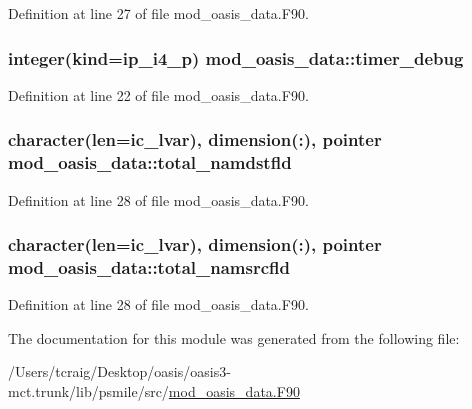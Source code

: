Definition at line 27 of file mod\+\_\+oasis\+\_\+data.\+F90.

\hypertarget{classmod__oasis__data_a320a34357de5c3049ccf102df7b97f5e}{
\subsubsection[{timer\+\_\+debug}]{\setlength{\rightskip}{0pt plus 5cm}integer(kind=ip\+\_\+i4\+\_\+p) mod\+\_\+oasis\+\_\+data\+::timer\+\_\+debug}}\label{classmod__oasis__data_a320a34357de5c3049ccf102df7b97f5e}


Definition at line 22 of file mod\+\_\+oasis\+\_\+data.\+F90.

\hypertarget{classmod__oasis__data_a81466361b20004007f221dd6a32041f9}{
\subsubsection[{total\+\_\+namdstfld}]{\setlength{\rightskip}{0pt plus 5cm}character(len=ic\+\_\+lvar), dimension(\+:), pointer mod\+\_\+oasis\+\_\+data\+::total\+\_\+namdstfld}}\label{classmod__oasis__data_a81466361b20004007f221dd6a32041f9}


Definition at line 28 of file mod\+\_\+oasis\+\_\+data.\+F90.

\hypertarget{classmod__oasis__data_a58b5a440f274f5dfb942d7e18f12674c}{
\subsubsection[{total\+\_\+namsrcfld}]{\setlength{\rightskip}{0pt plus 5cm}character(len=ic\+\_\+lvar), dimension(\+:), pointer mod\+\_\+oasis\+\_\+data\+::total\+\_\+namsrcfld}}\label{classmod__oasis__data_a58b5a440f274f5dfb942d7e18f12674c}


Definition at line 28 of file mod\+\_\+oasis\+\_\+data.\+F90.



The documentation for this module was generated from the following file\+:\begin{DoxyCompactItemize}
\item 
/\+Users/tcraig/\+Desktop/oasis/oasis3-\/mct.\+trunk/lib/psmile/src/\hyperlink{mod__oasis__data_8_f90}{mod\+\_\+oasis\+\_\+data.\+F90}\end{DoxyCompactItemize}
